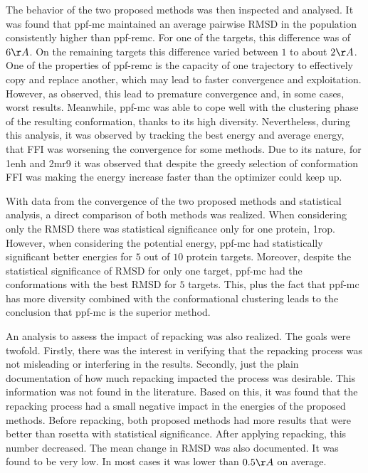 The behavior of the two proposed methods was then inspected and analysed. It was
found that ppf-mc maintained an average pairwise RMSD in the population
consistently higher than ppf-remc. For one of the targets, this difference was
of $6\AA$. On the remaining targets this difference varied between $1$ to about
$2\AA$. One of the properties of ppf-remc is the capacity of one trajectory to
effectively copy and replace another, which may lead to faster convergence and
exploitation. However, as observed, this lead to premature convergence and, in
some cases, worst results. Meanwhile, ppf-mc was able to cope well with the
clustering phase of the resulting conformation, thanks to its high diversity.
Nevertheless, during this analysis, it was observed by tracking the best energy
and average energy, that FFI was worsening the convergence for some methods.
Due to its nature, for 1enh and 2mr9 it was observed that despite the greedy
selection of conformation FFI was making the energy increase faster than the
optimizer could keep up.

With data from the convergence of the two proposed methods and statistical
analysis, a direct comparison of both methods was realized. When considering
only the RMSD there was statistical significance only for one protein, 1rop.
However, when considering the potential energy, ppf-mc had statistically
significant better energies for $5$ out of $10$ protein targets. Moreover,
despite the statistical significance of RMSD for only one target, ppf-mc had
the conformations with the best RMSD for $5$ targets. This, plus the fact that
ppf-mc has more diversity combined with the conformational clustering leads to
the conclusion that ppf-mc is the superior method.

An analysis to assess the impact of repacking was also realized. The goals were
twofold. Firstly, there was the interest in verifying that the repacking process
was not misleading or interfering in the results. Secondly, just the plain
documentation of how much repacking impacted the process was desirable. This
information was not found in the literature. Based on this, it was found that
the repacking process had a small negative impact in the energies of the
proposed methods. Before repacking, both proposed methods had more results that
were better than rosetta with statistical significance. After applying repacking,
this number decreased. The mean change in RMSD was also documented. It was found
to be very low. In most cases it was lower than $0.5\AA$ on average.


